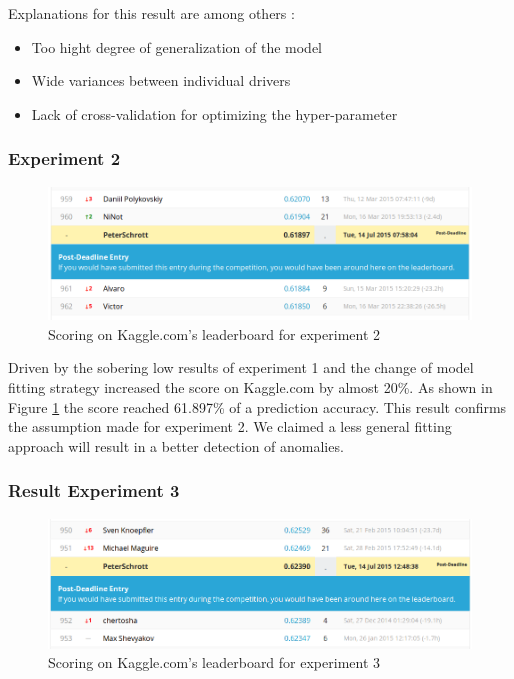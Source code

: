 \documentclass{vldb}
\begin{document}
Explanations for this result are among others :
\begin{itemize}
\item Too hight degree of generalization of the model
\item Wide variances between individual drivers
\item Lack of cross-validation for optimizing the hyper-pa\-ra\-me\-ter
\end{itemize}

\subsubsection*{Experiment 2}
\label{ssubsec:Res-e2}

\begin{figure}
\centering
\includegraphics[width=\linewidth]{"pics/kaggle-result-2"}
\caption{Scoring on Kaggle.com's leaderboard for experiment 2}
\label{fig:kaggle-result2}
\end{figure}

Driven by the sobering low results of experiment 1 and the change of model fitting strategy increased the score on Kaggle.com by almost 20\%. As shown in Figure \ref{fig:kaggle-result2} the score reached 61.897\% of a prediction accuracy. This result confirms the assumption made for experiment 2. We claimed a less general fitting approach will result in a better detection of anomalies. 

\subsubsection*{Result Experiment 3}
\label{ssubsec:Res-e3}

\begin{figure}
\centering
\includegraphics[width=\linewidth]{"pics/kaggle-result-3"}
\caption{Scoring on Kaggle.com's leaderboard for experiment 3}
\label{fig:kaggle-result3}
\end{figure}
 
\end{document}
